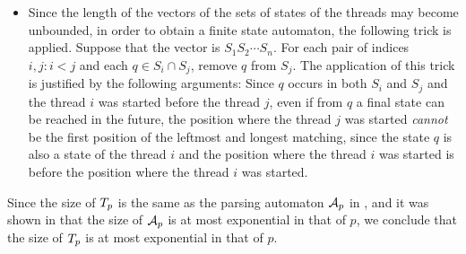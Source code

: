 \begin{itemize}
%
%
	\item Since the length of the vectors of the sets of states of the threads may become unbounded, in order to obtain a finite state automaton, the following trick is applied.
    Suppose that the vector is $S_1 S_2 \cdots S_n$.
    For each pair of indices $i, j: i < j$ and each $q \in S_i \cap S_j$, remove $q$ from $S_j$.
    The application of this trick is justified by the following arguments: Since $q$ occurs in both $S_i$ and $S_j$ and the thread $i$ was started before the thread $j$, even if from $q$  a final state can be reached in the future, the position where the thread $j$ was started \emph{cannot} be the first position of the leftmost and longest matching, since the state $q$ is also a state of the thread $i$ and the position where the thread $i$ was started is before the position where the thread $i$ was started.
\end{itemize}

Since the size of $T_p$ is the same as the parsing automaton $\mathcal{A}_p$ in \cite{CCHLW18}, and it was shown in  \cite{CCHLW18} that the size of $\mathcal{A}_p$ is at most exponential in that of $p$, we conclude that the size of $T_p$ is at most exponential in that of $p$.

